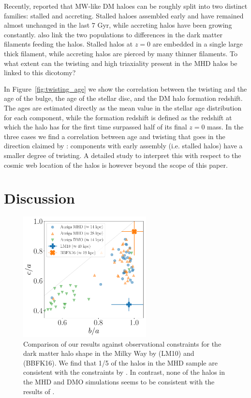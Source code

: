 \documentclass[usenatbib]{mnras}
\begin{document}
Recently, \citet{2017MNRAS.469..594B} reported that MW-like DM haloes can
be roughly split into two distinct families: stalled and accreting.
Stalled haloes assembled early and have remained almost unchanged
in the last $7$ Gyr, while accreting halos have been growing
constantly. \citet{2017MNRAS.469..594B} also link the two populations to
differences in the dark matter filaments feeding the halos. 
Stalled halos at $z=0$ are embedded in a single large thick filament, while
accreting halos are pierced by many thinner filaments. 
To what extent can the twisting and high triaxiality present in the MHD
halos be linked to this dicotomy?

In Figure~\ref{fig:twisting_age} we show the correlation between the
twisting and the age of the bulge, the age of the stellar disc, and the
DM halo formation redshift. The ages are estimated directly as the mean 
value in the stellar age distribution for each component, while the formation redshift is
defined as the redshift at which the halo has for the first time surpassed half of its final $z=0$
mass. In the three cases we find a correlation between age and twisting
that goes in the direction claimed by \citet{2017MNRAS.469..594B}:
components with early assembly (i.e. stalled halos) have a smaller degree of
twisting. A detailed study to interpret this with respect to the cosmic 
web location of the halos is however beyond the scope of this paper.

\section{Discussion}
\label{sec:discussion}

\begin{figure}
\begin{center}
\includegraphics[width=0.6\textwidth]{triaxiality_observations.pdf}
\end{center}
\caption{Comparison of our results against 
observational constraints for the 
dark matter halo shape in the Milky Way by \citet{LM10} (LM10) and
\citet{Bovy16} (BBFK16).   
We find that 1/5 of the halos in the MHD  sample are consistent with
the constraints by \citet{Bovy16}.
In contrast, none of the halos in the MHD and DMO simulations seems to be
consistent with the results of \citet{LM10}.}
\label{fig:observations}
\end{figure}
\end{document}
